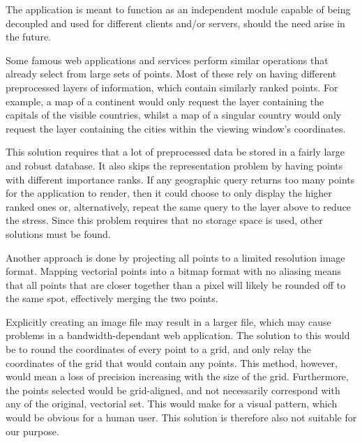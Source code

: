 

\begin{changed}
The application is meant to function as an independent module capable of being decoupled and used for different clients and/or servers, should the need arise in the future.

Some famous web applications and services perform similar operations that already select from large sets of points. Most of these rely on having different preprocessed layers of information, which contain similarly ranked points. For example, a map of a continent would only request the layer containing the capitals of the visible countries, whilst a map of a singular country would only request the layer containing the cities within the viewing window's coordinates.

This solution requires that a lot of preprocessed data be stored in a fairly large and robust database. It also skips the representation problem by having points with different importance ranks. If any geographic query returns too many points for the application to render, then it could choose to only display the higher ranked ones or, alternatively, repeat the same query to the layer above to reduce the stress. Since this problem requires that no storage space is used, other solutions must be found.

Another approach is done by projecting all points to a limited resolution image format. Mapping vectorial points into a bitmap format with no aliasing means that all points that are closer together than a pixel will likely be rounded off to the same spot, effectively merging the two points.

Explicitly creating an image file may result in a larger file, which may cause problems in a bandwidth-dependant web application. The solution to this would be to round the coordinates of every point to a grid, and only relay the coordinates of the grid that would contain any points. This method, however, would mean a loss of precision increasing with the size of the grid. Furthermore, the points selected would be grid-aligned, and not necessarily correspond with any of the original, vectorial set. This would make for a visual pattern, which would be obvious for a human user. This solution is therefore also not suitable for our purpose.


\end{changed}
